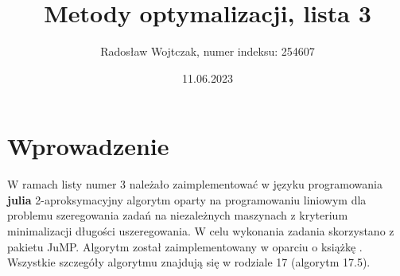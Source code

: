 \documentclass[12pt, a4paper]{report}
\title{Metody optymalizacji, lista 3}
\author{Radosław Wojtczak, numer indeksu: 254607}
\date{11.06.2023}
\begin{document}
\maketitle
\tableofcontents

\chapter{Wprowadzenie}
  W ramach listy numer 3 należało zaimplementować w języku programowania \textbf{julia} 2-aproksymacyjny
  algorytm oparty na programowaniu liniowym dla problemu szeregowania zadań na niezależnych maszynach
  z kryterium minimalizacji długości uszeregowania. W celu wykonania zadania skorzystano z pakietu JuMP.
  Algorytm został zaimplementowany w oparciu o książkę \cite{Alg}. Wszystkie szczegóły algorytmu 
  znajdują się w rodziale 17 (algorytm 17.5).
\end{document}
